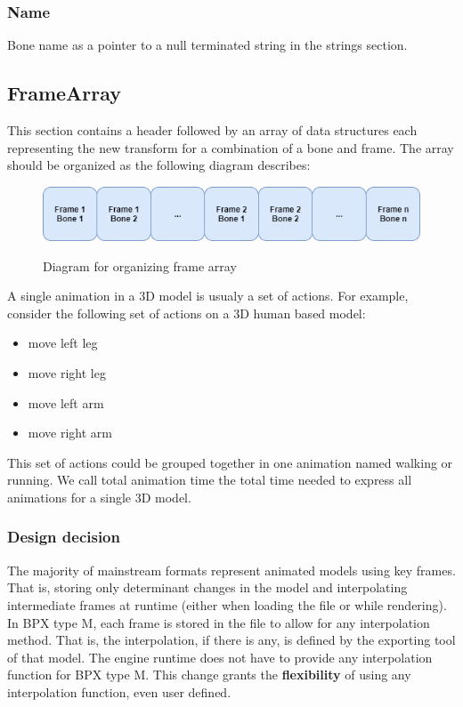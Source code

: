 \subsubsection{Name}
Bone name as a pointer to a null terminated string in the strings section.

\subsection{FrameArray}
This section contains a header followed by an array of data structures each representing the new transform for a combination of a bone and frame.\newline
The array should be organized as the following diagram describes:
\begin{figure}[h!]
    \centering
    \includegraphics[scale=0.7]{Types/FrameArray_Diagram.png}
    \label{fig:FrameArray_Diagram}
    \caption{Diagram for organizing frame array}
\end{figure}
\newline
A single animation in a 3D model is usualy a set of actions. For example, consider the following set of actions on a 3D human based model:
\begin{itemize}
    \item move left leg
    \item move right leg
    \item move left arm
    \item move right arm
\end{itemize}
This set of actions could be grouped together in one animation named walking or running.\newline
We call total animation time the total time needed to express all animations for a single 3D model.

\subsubsection{Design decision}
The majority of mainstream formats represent animated models using key frames. That is, storing only determinant changes in the model and interpolating intermediate frames at runtime (either when loading the file or while rendering). In BPX type M, each frame is stored in the file to allow for any interpolation method. That is, the interpolation, if there is any, is defined by the exporting tool of that model. The engine runtime does not have to provide any interpolation function for BPX type M.\newline
This change grants the \textbf{flexibility} of using any interpolation function, even user defined.

